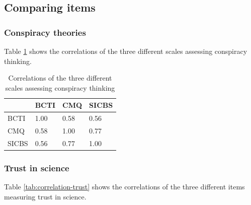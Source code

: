 \documentclass[
  doc,floatsintext]{apa6}
\begin{document}
\subsection{Comparing items}\label{comparing-items}

\subsubsection{Conspiracy theories}\label{conspiracy-theories}

Table \ref{tab:correlation-conspiracy} shows the correlations of the three different scales assessing conspiracy thinking.

\begin{table}[h]

\begin{center}
\begin{threeparttable}

\caption{\label{tab:correlation-conspiracy}Correlations of the three different scales assessing conspiracy thinking}

\begin{tabular}{llll}
\toprule
 & \multicolumn{1}{c}{BCTI} & \multicolumn{1}{c}{CMQ} & \multicolumn{1}{c}{SICBS}\\
\midrule
BCTI & 1.00 & 0.58 & 0.56\\
CMQ & 0.58 & 1.00 & 0.77\\
SICBS & 0.56 & 0.77 & 1.00\\
\bottomrule
\end{tabular}

\end{threeparttable}
\end{center}

\end{table}

\subsubsection{Trust in science}\label{trust-in-science-2}

Table \ref{tab:correlation-trust} shows the correlations of the three different items measuring trust in science.
\end{document}
